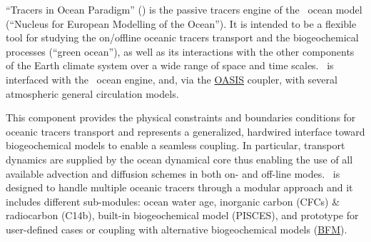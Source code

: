 
``Tracers in Ocean Paradigm'' (\TOP) is the passive tracers engine of
the \NEMO\ ocean model (``Nucleus for European Modelling of the Ocean'').
It is intended to be a flexible tool for studying the on/offline oceanic tracers transport and
the biogeochemical processes (``green ocean''),
as well as its interactions with the other components of the Earth climate system over
a wide range of space and time scales.
\TOP\ is interfaced with the \NEMO\ ocean engine, and,
via the \href{http://portal.enes.org/oasis}{OASIS} coupler,
with several atmospheric general circulation models.

This component provides the physical constraints and boundaries conditions for
oceanic tracers transport and represents a generalized, hardwired interface toward
biogeochemical models to enable a seamless coupling.
In particular, transport dynamics are supplied by the ocean dynamical core thus
enabling the use of all available advection and diffusion schemes in both on- and off-line modes.
\TOP\ is designed to handle multiple oceanic tracers through a modular approach and
it includes different sub-modules: ocean water age, inorganic carbon (CFCs) \& radiocarbon (C14b),
built-in biogeochemical model (PISCES), and prototype for user-defined cases or
coupling with alternative biogeochemical models (\eg \href{http://www.bfm-community.eu}{BFM}).
